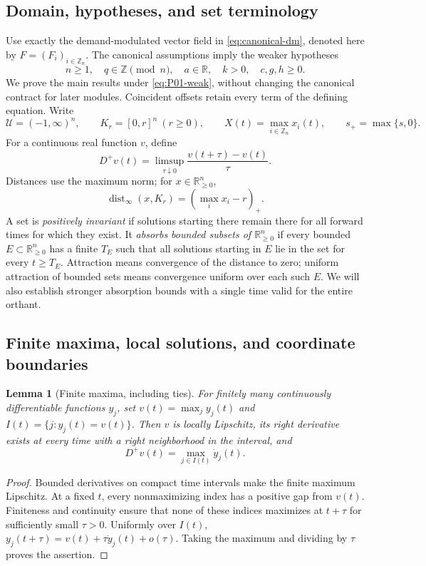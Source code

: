 \documentclass[11pt]{article}
\newcommand{\R}{\mathbb{R}}
\newcommand{\Z}{\mathbb{Z}}
\newcommand{\Zn}{\mathbb{Z}_n}
\newcommand{\Orth}{\R_{\geq 0}^{n}}
\newcommand{\Domain}{\mathcal{U}}
\newtheorem{lemma}[theorem]{Lemma}
\theoremstyle{definition}
\theoremstyle{remark}
\begin{document}
\subsection{Domain, hypotheses, and set terminology}
Use exactly the demand-modulated vector field in
\eqref{eq:canonical-dm}, denoted here by $F=(F_i)_{i\in\Zn}$.
The canonical assumptions imply the weaker hypotheses
\begin{equation}
\label{eq:P01-weak}
 n\ge1,\quad q\in\Z\pmod n,\quad
 a\in\R,\quad k>0,\quad c,g,h\ge0.
\tag{P01-W}
\end{equation}
We prove the main results under \eqref{eq:P01-weak}, without changing the
canonical contract for later modules. Coincident offsets retain every
term of the defining equation. Write
\[
 \Domain=(-1,\infty)^n,\qquad K_r=[0,r]^n\ (r\ge0),\qquad
 X(t)=\max_{i\in\Zn}x_i(t),\qquad s_+=\max\{s,0\}.
\]
For a continuous real function $v$, define
\[
 D^+v(t)=\limsup_{\tau\downarrow0}
             \frac{v(t+\tau)-v(t)}{\tau}.
\]
Distances use the maximum norm; for $x\in\Orth$,
\begin{equation}
\label{eq:P01-distance}
 \operatorname{dist}_\infty(x,K_r)=(\max_i x_i-r)_+.
\end{equation}
A set is \emph{positively invariant} if solutions starting there remain
there for all forward times for which they exist. It \emph{absorbs bounded
subsets of $\Orth$} if every bounded $E\subset\Orth$ has a finite $T_E$
such that all solutions starting in $E$ lie in the set for every
$t\ge T_E$. Attraction means convergence of the distance to zero;
uniform attraction of bounded sets means convergence uniform over each
such $E$. We will also establish stronger absorption bounds with a
single time valid for the entire orthant.

\subsection{Finite maxima, local solutions, and coordinate boundaries}
\label{slot:P01-1}

\begin{lemma}[Finite maxima, including ties]
\label{lem:P01-max}
For finitely many continuously differentiable functions $y_j$, set
$v(t)=\max_j y_j(t)$ and $I(t)=\{j:y_j(t)=v(t)\}$.
Then $v$ is locally Lipschitz, its right derivative exists at every
time with a right neighborhood in the interval, and
\begin{equation}
\label{eq:P01-max}
 D^+v(t)=\max_{j\in I(t)}\dot y_j(t).
\end{equation}
\end{lemma}
\begin{proof}
Bounded derivatives on compact time intervals make the finite maximum
Lipschitz. At a fixed $t$, every nonmaximizing index has a positive gap
from $v(t)$. Finiteness and continuity ensure that none of these indices
maximizes at $t+\tau$ for sufficiently small $\tau>0$. Uniformly over
$I(t)$,
$y_j(t+\tau)=v(t)+\tau\dot y_j(t)+o(\tau)$.
Taking the maximum and dividing by $\tau$ proves the assertion.
\end{proof}
\end{document}
